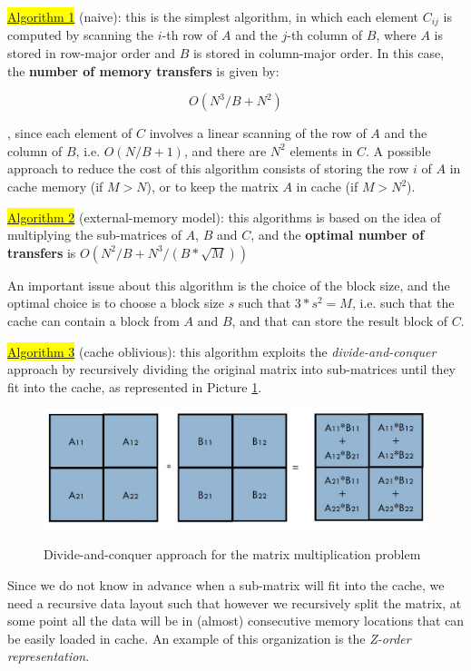 \colorbox{yellow}{\underline{Algorithm 1}} (naive): this is the simplest algorithm, in which each element $C_{ij}$ is computed by scanning the $i$-th row of $A$ and the $j$-th column of $B$, where $A$ is stored in row-major order and $B$ is stored in column-major order. In this case, the \textbf{number of memory transfers} is given by:

$$
O(N^3/B + N^2)
$$

, since each element of $C$ involves a linear scanning of the row of $A$ and the column of $B$, i.e. $O(N/B + 1)$, and there are $N^2$ elements in $C$. A possible approach to reduce the cost of this algorithm consists of storing the row $i$ of $A$ in cache memory (if $M > N$), or to keep the matrix $A$ in cache (if $M > N^2$).

\colorbox{yellow}{\underline{Algorithm 2}} (external-memory model): this algorithms is based on the idea of multiplying the sub-matrices of $A$, $B$ and $C$, and the \textbf{optimal number of transfers} is $O(N^2/B + N^3/(B * \sqrt{M}))$

An important issue about this algorithm is the choice of the block size, and the optimal choice is to choose a block size $s$ such that $3*s^2 = M$, i.e. such that the cache can contain a block from $A$ and $B$, and that can store the result block of $C$.  

\colorbox{yellow}{\underline{Algorithm 3}} (cache oblivious): this algorithm exploits the \textit{divide-and-conquer} approach by recursively dividing the original matrix into sub-matrices until they fit into the cache, as represented in Picture \ref{mm_cache_oblivious}.

\begin{figure}[h!]
		\centering
		\includegraphics[scale = 0.9]{img/iimproved_algo.jpg}
        \label{mm_cache_oblivious}
        \caption{Divide-and-conquer approach for the matrix multiplication problem}
\end{figure}

Since we do not know in advance when a sub-matrix will fit into the cache, we need a recursive data layout such that however we recursively split the matrix, at some point all the data will be in (almost) consecutive memory locations that can be easily loaded in cache. An example of this organization is the \textit{Z-order representation}. 


